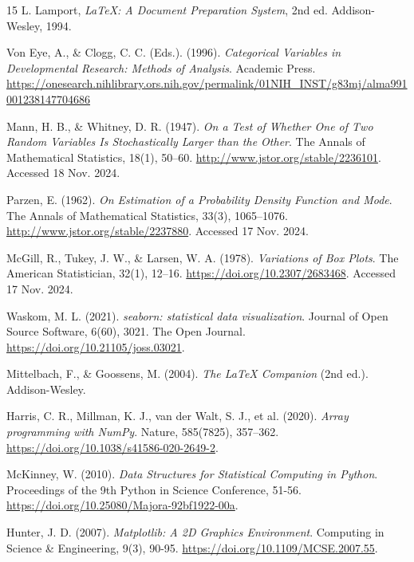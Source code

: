 \begin{thebibliography}{15}
L. Lamport, \textit{\LaTeX: A Document Preparation System}, 2nd ed. Addison-Wesley, 1994.

Von Eye, A., \& Clogg, C. C. (Eds.). (1996). 
\textit{Categorical Variables in Developmental Research: Methods of Analysis}. 
Academic Press. 
\url{https://onesearch.nihlibrary.ors.nih.gov/permalink/01NIH_INST/g83mj/alma991001238147704686}

Mann, H. B., \& Whitney, D. R. (1947).
\textit{On a Test of Whether One of Two Random Variables Is Stochastically Larger than the Other}.
The Annals of Mathematical Statistics, 18(1), 50--60.
\url{http://www.jstor.org/stable/2236101}. Accessed 18 Nov. 2024.

Parzen, E. (1962). 
\textit{On Estimation of a Probability Density Function and Mode}. 
The Annals of Mathematical Statistics, 33(3), 1065--1076. 
\url{http://www.jstor.org/stable/2237880}. Accessed 17 Nov. 2024.

McGill, R., Tukey, J. W., \& Larsen, W. A. (1978). 
\textit{Variations of Box Plots}. 
The American Statistician, 32(1), 12--16. 
\url{https://doi.org/10.2307/2683468}. Accessed 17 Nov. 2024.

Waskom, M. L. (2021). 
\textit{seaborn: statistical data visualization}. 
Journal of Open Source Software, 6(60), 3021. 
The Open Journal. 
\url{https://doi.org/10.21105/joss.03021}.

Mittelbach, F., \& Goossens, M. (2004).
\textit{The LaTeX Companion} (2nd ed.).
Addison-Wesley.

Harris, C. R., Millman, K. J., van der Walt, S. J., et al. (2020).
\textit{Array programming with NumPy}.
Nature, 585(7825), 357–362.
\href{https://doi.org/10.1038/s41586-020-2649-2}{https://doi.org/10.1038/s41586-020-2649-2}.

McKinney, W. (2010).
\textit{Data Structures for Statistical Computing in Python}.
Proceedings of the 9th Python in Science Conference, 51-56.
\href{https://doi.org/10.25080/Majora-92bf1922-00a}{https://doi.org/10.25080/Majora-92bf1922-00a}.

Hunter, J. D. (2007).
\textit{Matplotlib: A 2D Graphics Environment}.
Computing in Science \& Engineering, 9(3), 90-95.
\href{https://doi.org/10.1109/MCSE.2007.55}{https://doi.org/10.1109/MCSE.2007.55}.


\end{thebibliography}
